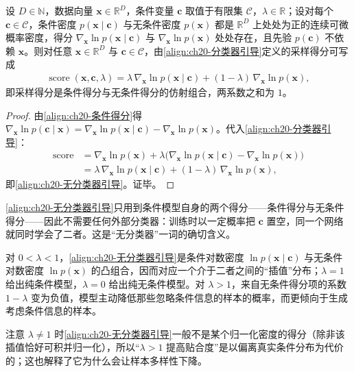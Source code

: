 \documentclass[../../main.tex]{subfiles}
\begin{document}
\begin{proposition}\label{proposition:ch20-无分类器引导}
设 $D\in\mathbb{N}$，数据向量 $\bm{x}\in\mathbb{R}^{D}$，条件变量 $\bm{c}$ 取值于有限集 $\mathcal{C}$，$\lambda\in\mathbb{R}$；设对每个 $\bm{c}\in\mathcal{C}$，条件密度 $p(\bm{x}\mid\bm{c})$ 与无条件密度 $p(\bm{x})$ 都是 $\mathbb{R}^{D}$ 上处处为正的连续可微概率密度，得分 $\nabla_{\bm{x}}\ln p(\bm{x}\mid\bm{c})$ 与 $\nabla_{\bm{x}}\ln p(\bm{x})$ 处处存在，且先验 $p(\bm{c})$ 不依赖 $\bm{x}$。则对任意 $\bm{x}\in\mathbb{R}^{D}$ 与 $\bm{c}\in\mathcal{C}$，由\eqref{align:ch20-分类器引导}定义的采样得分可写成
\begin{align}
\operatorname{score}(\bm{x},\bm{c},\lambda)=\lambda\,\nabla_{\bm{x}}\ln p(\bm{x}\mid\bm{c})+(1-\lambda)\,\nabla_{\bm{x}}\ln p(\bm{x}),
\label{align:ch20-无分类器引导}
\end{align}
即采样得分是条件得分与无条件得分的仿射组合，两系数之和为 $1$。
\end{proposition}

\begin{proof}
由\eqref{align:ch20-条件得分}得 $\nabla_{\bm{x}}\ln p(\bm{c}\mid\bm{x})=\nabla_{\bm{x}}\ln p(\bm{x}\mid\bm{c})-\nabla_{\bm{x}}\ln p(\bm{x})$。代入\eqref{align:ch20-分类器引导}：
\begin{align*}
\operatorname{score}&=\nabla_{\bm{x}}\ln p(\bm{x})+\lambda\big(\nabla_{\bm{x}}\ln p(\bm{x}\mid\bm{c})-\nabla_{\bm{x}}\ln p(\bm{x})\big)\\
&=\lambda\,\nabla_{\bm{x}}\ln p(\bm{x}\mid\bm{c})+(1-\lambda)\,\nabla_{\bm{x}}\ln p(\bm{x}),
\end{align*}
即\eqref{align:ch20-无分类器引导}。证毕。
\end{proof}

\begin{remark}
\eqref{align:ch20-无分类器引导}只用到条件模型自身的两个得分——条件得分与无条件得分——因此不需要任何外部分类器：训练时以一定概率把 $\bm{c}$ 置空，同一个网络就同时学会了二者。这是“无分类器”一词的确切含义。\par
对 $0<\lambda<1$，\eqref{align:ch20-无分类器引导}是条件对数密度 $\ln p(\bm{x}\mid\bm{c})$ 与无条件对数密度 $\ln p(\bm{x})$ 的凸组合，因而对应一个介于二者之间的“插值”分布；$\lambda=1$ 给出纯条件模型，$\lambda=0$ 给出纯无条件模型。对 $\lambda>1$，来自无条件得分项的系数 $1-\lambda$ 变为负值，模型主动降低那些忽略条件信息的样本的概率，而更倾向于生成考虑条件信息的样本。\par
注意 $\lambda\neq1$ 时\eqref{align:ch20-无分类器引导}一般不是某个归一化密度的得分（除非该插值恰好可积并归一化），所以“$\lambda>1$ 提高贴合度”是以偏离真实条件分布为代价的；这也解释了它为什么会让样本多样性下降。
\end{remark}
\end{document}
